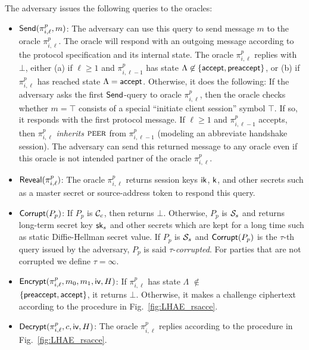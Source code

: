 The adversary issues the following queries to the
oracles:
\begin{itemize}
 \item {$\mathsf{Send}(\pi^p_{i, \ell}, m)$:
 The adversary can use this query to send message
 $m$ to the oracle $\pi^p_{i, \ell}$.
 The oracle will respond with an outgoing message
 according to the protocol specification and its
 internal state.
 The oracle $\pi^p_{i, \ell}$ replies with $\bot$,
 either (a) if $\ell \geq 1$ and
 $\pi^p_{i, {\ell-1}}$ has state
 $\Lambda\not\in \{\mathsf{accept}, \mathsf{preaccept}\}$, or (b)
 if $\pi^p_{i,\ell}$ has reached state
 $\Lambda = \mathsf{accept}$.
 Otherwise, it does the following: If the adversary
 asks the first $\mathsf{Send}$-query to oracle
 $\pi^p_{i, \ell}$, then the oracle checks whether
 $m = \top$ consists of a special
 ``initiate client session'' symbol $\top$.
 If so, it responds with the first protocol message.
 If $\ell \geq 1$ and $\pi^p_{i,\ell-1}$ accepts,
 then $\pi^p_{i,\ell}$ \textit{inherits} $\textsc{peer}$ from
 $\pi^p_{i, \ell-1}$ (modeling an abbreviate handshake
 session).
 The adversary can send this returned message to any
 oracle even if this oracle is not intended partner of
 the oracle $\pi^p_{i, \ell}$.}

 \item {$\mathsf{Reveal}(\pi^p_{i,\ell})$:
 The oracle $\pi^p_{i,\ell}$ returns session keys
 $\mathsf{ik}$, $\mathsf{k}$, and other secrets such as a master
 secret or source-address token to respond this query.}

 \item {$\mathsf{Corrupt}(P_p)$:
 If $P_p$ is $\mathcal{C}_c$, then returns $\bot$.
 Otherwise, $P_p$ is $\mathcal{S}_s$ and returns long-term
 secret key $\mathsf{sk}_s$ and other secrets which are kept
 for a long time such as static Diffie-Hellman secret
 value.
 If $P_p$ is $\mathcal{S}_s$ and $\mathsf{Corrupt}(P_p)$ is the
 $\tau$-th query issued by the adversary, $P_p$ is said
 $\tau$-\textit{corrupted}.
 For parties that are not corrupted we define
 $\tau = \infty$.}

 \item {$\mathsf{Encrypt}(\pi^p_{i,\ell}, m_0, m_1, \mathsf{iv}, H)$:
 If $\pi^p_{i,\ell}$ has state
 $\Lambda$ $\not\in$ \\ $\{\mathsf{preaccept}, \mathsf{accept}\}$,
 it returns $\bot$.
 Otherwise, it makes a challenge ciphertext according to
 the procedure in Fig.~\ref{fig:LHAE_rsacce}.}

 \item {$\mathsf{Decrypt}(\pi^p_{i, \ell}, c, \mathsf{iv}, H)$:
 The oracle $\pi^p_{i, \ell}$ replies according to the
 procedure in Fig.~\ref{fig:LHAE_rsacce}.}
\end{itemize}

